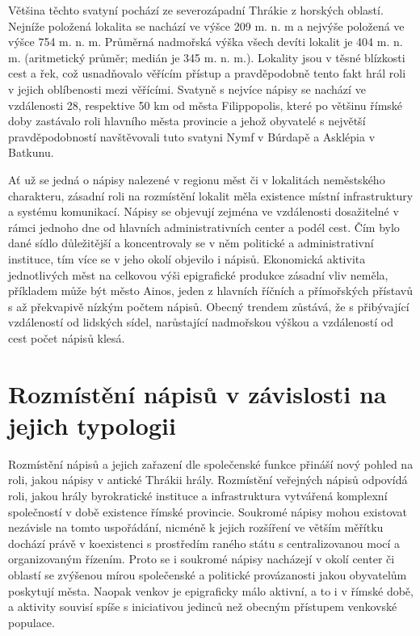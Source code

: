 Většina těchto svatyní pochází ze severozápadní Thrákie z horských oblastí. Nejníže položená lokalita se nachází ve výšce 209 m. n. m a nejvýše položená ve výšce 754 m. n. m. Průměrná nadmořská výška všech devíti lokalit je 404 m. n. m. (aritmetický průměr; medián je 345 m. n. m.). Lokality jsou v těsné blízkosti cest a řek, což usnadňovalo věřícím přístup a pravděpodobně tento fakt hrál roli v jejich oblíbenosti mezi věřícími. Svatyně s nejvíce nápisy se nachází ve vzdálenosti 28, respektive 50 km od města Filippopolis, které po většinu římské doby zastávalo roli hlavního města provincie a jehož obyvatelé s největší pravděpodobností navštěvovali tuto svatyni Nymf v Búrdapě a Asklépia v Batkunu.

Ať už se jedná o nápisy nalezené v regionu měst či v lokalitách neměstského charakteru, zásadní roli na rozmístění lokalit měla existence místní infrastruktury a systému komunikací. Nápisy se objevují zejména ve vzdálenosti dosažitelné v rámci jednoho dne od hlavních administrativních center a podél cest. Čím bylo dané sídlo důležitější a koncentrovaly se v něm politické a administrativní instituce, tím více se v jeho okolí objevilo i nápisů. Ekonomická aktivita jednotlivých měst na celkovou výši epigrafické produkce zásadní vliv neměla, příkladem může být město Ainos, jeden z hlavních říčních a přímořských přístavů s až překvapivě nízkým počtem nápisů. Obecný trendem zůstává, že s přibývající vzdáleností od lidských sídel, narůstající nadmořskou výškou a vzdáleností od cest počet nápisů klesá.

\section[rozmístění-nápisů-v-závislosti-na-jejich-typologii]{Rozmístění nápisů v závislosti na jejich typologii}

Rozmístění nápisů a jejich zařazení dle společenské funkce přináší nový pohled na roli, jakou nápisy v antické Thrákii hrály. Rozmístění veřejných nápisů odpovídá roli, jakou hrály byrokratické instituce a infrastruktura vytvářená komplexní společností v době existence římské provincie. Soukromé nápisy mohou existovat nezávisle na tomto uspořádání, nicméně k jejich rozšíření ve větším měřítku dochází právě v koexistenci s prostředím raného státu s centralizovanou mocí a organizovaným řízením. Proto se i soukromé nápisy nacházejí v okolí center či oblastí se zvýšenou mírou společenské a politické provázanosti jakou obyvatelům poskytují města. Naopak venkov je epigraficky málo aktivní, a to i v římské době, a aktivity souvisí spíše s iniciativou jedinců než obecným přístupem venkovské populace.

